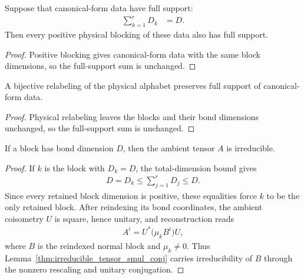 \begin{lemma}
    \label{thm:mpu_full_support_blocking}
    \leanok
    Suppose that canonical-form data have full support:
    \begin{align}
        \sum_{k=1}^rD_k & =D.
    \end{align}
    Then every positive physical blocking of these data also has full
    support.
\end{lemma}

\begin{proof}\leanok
    Positive blocking gives canonical-form data with the same block
    dimensions, so the full-support sum is unchanged.
\end{proof}

\begin{lemma}
    \label{thm:mpu_full_support_reindexing}
    \leanok
    A bijective relabeling of the physical alphabet preserves full
    support of canonical-form data.
\end{lemma}

\begin{proof}\leanok
    Physical relabeling leaves the blocks and their bond
    dimensions unchanged, so the full-support sum is unchanged.
\end{proof}

\begin{lemma}
    \label{thm:mpu_block_ambient_irreducible}
    \leanok
    If a block has bond dimension $D$, then the ambient tensor $A$ is
    irreducible.
\end{lemma}

\begin{proof}\leanok
    If $k$ is the block with $D_k=D$, the total-dimension bound gives
    \begin{align}
        D = D_k \leq \sum_{j=1}^r D_j \leq D.
    \end{align}
    Since every retained block dimension is positive, these equalities force
    $k$ to be the only retained block.  After reindexing its bond coordinates,
    the ambient coisometry $U$ is square, hence unitary, and reconstruction reads
    \begin{align}
        A^i = U^*\bigl(\mu_k B^i\bigr)U,
    \end{align}
    where $B$ is the reindexed normal block and $\mu_k\ne0$.  Thus
    Lemma~\ref{thm:irreducible_tensor_smul_conj} carries irreducibility of
    $B$ through the nonzero rescaling and unitary conjugation.
\end{proof}

